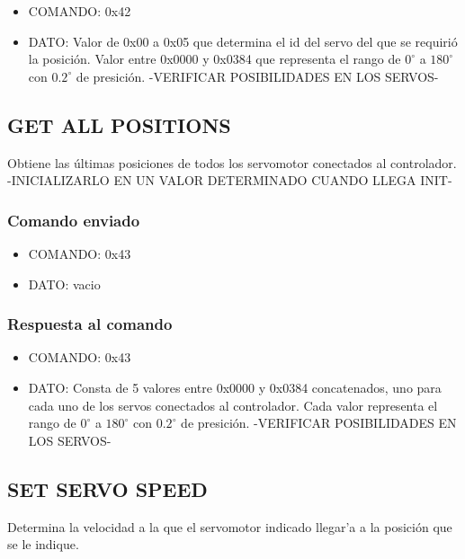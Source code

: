 \documentclass[a4paper,10pt]{article}
\begin{document}
\begin{itemize}
	\item{COMANDO:} 0x42
	\item{DATO:} Valor de 0x00 a 0x05 que determina el id del servo del que se requiri\'o la posici\'on.
	Valor entre 0x0000 y 0x0384 que representa el rango de $0^{\circ}$ a $180^{\circ}$ con $0.2^{\circ}$ de presici\'on. -VERIFICAR POSIBILIDADES EN LOS SERVOS-
\end{itemize}

\subsection{GET ALL POSITIONS}
\label{get_all_positions}

Obtiene las \'ultimas posiciones de todos los servomotor conectados al controlador. -INICIALIZARLO EN UN VALOR DETERMINADO CUANDO LLEGA INIT-

\subsubsection*{Comando enviado}

\begin{itemize}
	\item{COMANDO:} 0x43
	\item{DATO:} vacio
\end{itemize}

\subsubsection*{Respuesta al comando}

\begin{itemize}
	\item{COMANDO:} 0x43
	\item{DATO:} Consta de 5 valores entre 0x0000 y 0x0384 concatenados, uno para cada uno de los servos conectados al controlador.
	Cada valor representa el rango de $0^{\circ}$ a $180^{\circ}$ con $0.2^{\circ}$ de presici\'on. -VERIFICAR POSIBILIDADES EN LOS SERVOS-
\end{itemize}

\subsection{SET SERVO SPEED}
\label{set_servo_speed}

Determina la velocidad a la que el servomotor indicado llegar'a a la posici\'on que se le indique.
\end{document}
